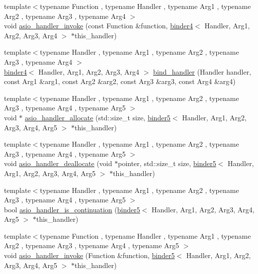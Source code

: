 \begin{DoxyCompactItemize}
\item 
{\footnotesize template$<$typename Function , typename Handler , typename Arg1 , typename Arg2 , typename Arg3 , typename Arg4 $>$ }\\void \hyperlink{namespaceasio_1_1detail_a08db52dba600cd100c34b810316bfa61}{asio\+\_\+handler\+\_\+invoke} (const Function \&function, \hyperlink{classasio_1_1detail_1_1binder4}{binder4}$<$ Handler, Arg1, Arg2, Arg3, Arg4 $>$ $\ast$this\+\_\+handler)
\item 
{\footnotesize template$<$typename Handler , typename Arg1 , typename Arg2 , typename Arg3 , typename Arg4 $>$ }\\\hyperlink{classasio_1_1detail_1_1binder4}{binder4}$<$ Handler, Arg1, Arg2, Arg3, Arg4 $>$ \hyperlink{namespaceasio_1_1detail_a45cdbea503937f731703a139a40737a0}{bind\+\_\+handler} (Handler handler, const Arg1 \&arg1, const Arg2 \&arg2, const Arg3 \&arg3, const Arg4 \&arg4)
\item 
{\footnotesize template$<$typename Handler , typename Arg1 , typename Arg2 , typename Arg3 , typename Arg4 , typename Arg5 $>$ }\\void $\ast$ \hyperlink{namespaceasio_1_1detail_a684600a70e975f2015862b0a6d097fb9}{asio\+\_\+handler\+\_\+allocate} (std\+::size\+\_\+t size, \hyperlink{classasio_1_1detail_1_1binder5}{binder5}$<$ Handler, Arg1, Arg2, Arg3, Arg4, Arg5 $>$ $\ast$this\+\_\+handler)
\item 
{\footnotesize template$<$typename Handler , typename Arg1 , typename Arg2 , typename Arg3 , typename Arg4 , typename Arg5 $>$ }\\void \hyperlink{namespaceasio_1_1detail_a85936936cdbbb482e333fb4cd574e8eb}{asio\+\_\+handler\+\_\+deallocate} (void $\ast$pointer, std\+::size\+\_\+t size, \hyperlink{classasio_1_1detail_1_1binder5}{binder5}$<$ Handler, Arg1, Arg2, Arg3, Arg4, Arg5 $>$ $\ast$this\+\_\+handler)
\item 
{\footnotesize template$<$typename Handler , typename Arg1 , typename Arg2 , typename Arg3 , typename Arg4 , typename Arg5 $>$ }\\bool \hyperlink{namespaceasio_1_1detail_af7d1ea4fb26718f0519e89159c3c4b1e}{asio\+\_\+handler\+\_\+is\+\_\+continuation} (\hyperlink{classasio_1_1detail_1_1binder5}{binder5}$<$ Handler, Arg1, Arg2, Arg3, Arg4, Arg5 $>$ $\ast$this\+\_\+handler)
\item 
{\footnotesize template$<$typename Function , typename Handler , typename Arg1 , typename Arg2 , typename Arg3 , typename Arg4 , typename Arg5 $>$ }\\void \hyperlink{namespaceasio_1_1detail_af0259e4a6c44817ed0f5a5991b1baf12}{asio\+\_\+handler\+\_\+invoke} (Function \&function, \hyperlink{classasio_1_1detail_1_1binder5}{binder5}$<$ Handler, Arg1, Arg2, Arg3, Arg4, Arg5 $>$ $\ast$this\+\_\+handler)

\end{DoxyCompactItemize}
